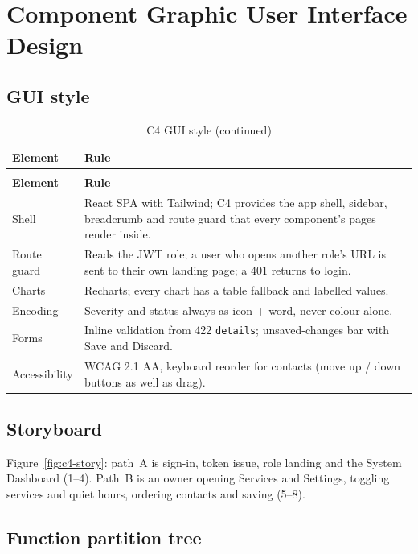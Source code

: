 \section{Component Graphic User Interface Design}

\subsection{GUI style}
\begin{longtable}{L{3.0cm}L{11.8cm}}
\caption{C4 GUI style}\\
\toprule
\textbf{Element} & \textbf{Rule} \\
\midrule
\endfirsthead
\caption[]{C4 GUI style (continued)}\\
\toprule
\textbf{Element} & \textbf{Rule} \\
\midrule
\endhead
Shell & React SPA with Tailwind; C4 provides the app shell, sidebar, breadcrumb and route guard that every component's pages render inside. \\
Route guard & Reads the JWT role; a user who opens another role's URL is sent to their own landing page; a 401 returns to login. \\
Charts & Recharts; every chart has a table fallback and labelled values. \\
Encoding & Severity and status always as icon + word, never colour alone. \\
Forms & Inline validation from 422 \texttt{details}; unsaved-changes bar with Save and Discard. \\
Accessibility & WCAG 2.1 AA, keyboard reorder for contacts (move up / down buttons as well as drag). \\
\bottomrule
\end{longtable}

\subsection{Storyboard}
Figure~\ref{fig:c4-story}: path~A is sign-in, token issue, role landing and the System Dashboard (1--4). Path~B is an
owner opening Services and Settings, toggling services and quiet hours, ordering contacts and saving (5--8).


\subsection{Function partition tree}

